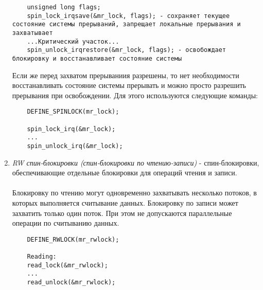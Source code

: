 \begin{enumerate}
\begin{lstlisting}
    unsigned long flags;
    spin_lock_irqsave(&mr_lock, flags); - сохраняет текущее состояние системы прерываний, запрещает локальные прерывания и захватывает
    ...Критический участок...
    spin_unlock_irqrestore(&mr_lock, flags); - освобождает блокировку и восстанавливает состояние системы
    \end{lstlisting}
    Если же перед захватом прерываниия разрешены, то нет необходимости восстанавливать состояние системы прерывать и можно просто разрешить прерывания при освобождении. Для этого используются следующие команды:
    \begin{lstlisting}
    DEFINE_SPINLOCK(mr_lock);
    
    spin_lock_irq(&mr_lock);
    ...
    spin_unlock_irq(&mr_lock);
    \end{lstlisting}
    \item \textit{RW спин-блокировки (спин-блокировки по чтению-записи)} - спин-блокировки, обеспечивающие отдельные блокировки для операций чтения и записи. 
    \\\\
    Блокировку по чтению могут одновременно захватывать несколько потоков, в которых выполняется считывание данных. Блокировку по записи может захватить только один поток. При этом не допускаются параллельные операции по считыванию данных.
    
    \begin{lstlisting}
    DEFINE_RWLOCK(mr_rwlock);
    
    Reading:
    read_lock(&mr_rwlock);
    ...
    read_unlock(&mr_rwlock);
    

\end{lstlisting}
\end{enumerate}
